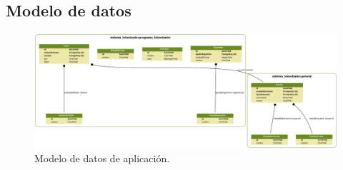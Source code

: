 %
%

\subsection{Modelo de datos}

\begin{figure}
  \begin{center}
    \includegraphics[width=1.0\linewidth]{diagramas/modelo_de_datos.png}
    \caption{Modelo de datos de aplicación.}
    \label{figura:modelo_De_datos}
  \end{center}
\end{figure}
